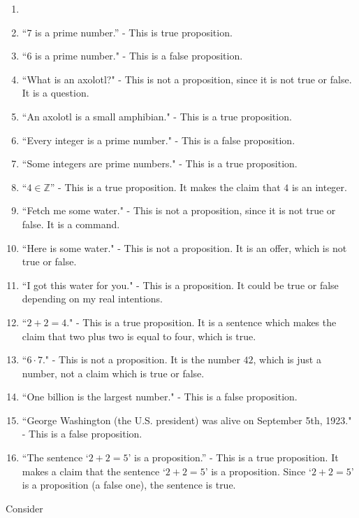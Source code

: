 \begin{solutions}
	\begin{enumerate}
		\item[] \mbox{}\\
		\item ``$7$ is a prime number.'' -  This is true proposition.
		\item ``$6$ is a prime number." -  This is a false proposition.
		\item ``What is an axolotl?" - This is not a proposition, since it is not true or false.  It is a question.
		\item ``An axolotl is a small amphibian." -  This is a true proposition.
		\item ``Every integer is a prime number." -  This is a false proposition.
		\item ``Some integers are prime numbers." - This is a true proposition.
		\item  ``$4 \in \mathbb{Z}$'' - This is a true proposition.  It makes the claim that $4$ is an integer.
		\item ``Fetch me some water." -  This is not a proposition, since it is not true or false.  It is a command.
		\item ``Here is some water." -  This is not a proposition.  It is an offer, which is not true or false.
		\item ``I got this water for you." -  This is a proposition.  It could be true or false depending on my real intentions.
		\item ``$2+2 = 4$." -  This is a true proposition.  It is a sentence which makes the claim that two plus two is equal to four, which is true.
		\item ``$6 \cdot 7$." -  This is not a proposition.  It is the number $42$, which is just a number, not a claim which is true or false.
		\item ``One billion is the largest number." -  This is a false proposition.
		\item ``George Washington (the U.S. president) was alive on September 5th, 1923." -  This is a false proposition.
		\item ``The sentence `$2+2 = 5$' is a proposition.'' - This is a true proposition.  It makes a claim that the sentence `$2+2 = 5$' is a proposition.  Since `$2+2 = 5$' is a proposition (a false one), the sentence is true.
	\end{enumerate}
\end{solutions}

Consider

